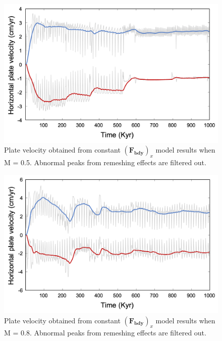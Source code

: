 \documentclass[letterpaper,12pt,notitle]{memphisthesis}                     %
\begin{document}

\begin{figure}[!htb]
	\centering
	\includegraphics[width=0.9\linewidth]{./figs/m05vel.png}
	\caption{Plate velocity obtained from constant $(\boldsymbol{F_{bdy}})_x$ model results when M = 0.5. Abnormal peaks from remeshing effects are filtered out.}
	\label{fig:m05vel}
\end{figure}



\begin{figure}[!htb]
	\centering
	\includegraphics[width=0.9\linewidth]{./figs/m08vel.png}
	\caption{Plate velocity obtained from constant $(\boldsymbol{F_{bdy}})_x$ model results when M = 0.8. Abnormal peaks from remeshing effects are filtered out.} 
	\label{fig:m08vel}
\end{figure}
\end{document}
